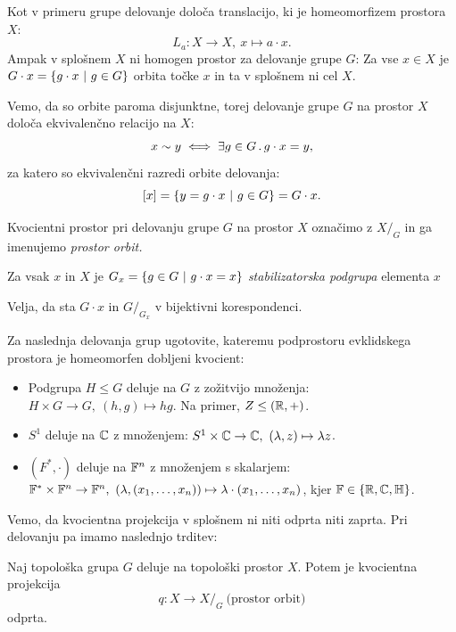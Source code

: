 \begin{opomba}
    Kot v primeru grupe delovanje določa translacijo, ki je homeomorfizem prostora \(X\): 
    \[L_a: X \to X, \ x \mapsto a \cdot x.\]
    Ampak v splošnem \(X\) ni homogen prostor za delovanje grupe \(G\): Za vse \(x \in X\) je \(G \cdot x = \left\{g \cdot x \ | \ g \in G\right\}\) orbita točke \(x\) in ta v splošnem ni cel \(X\). 
\end{opomba}

Vemo, da so orbite paroma disjunktne, torej delovanje grupe \(G\) na prostor \(X\) določa ekvivalenčno relacijo na \(X\):
\[x \sim y \iff \exists g \in G \,.\, g \cdot x = y,\]
za katero so ekvivalenčni razredi orbite delovanja:
\[[x] = \left\{y = g \cdot x \ | \ g \in G\right\} = G \cdot x.\]
%
\begin{definicija}
    Kvocientni prostor pri delovanju grupe \(G\) na prostor \(X\) označimo z \(X/_G\) in ga imenujemo \emph{prostor orbit.}
\end{definicija}

\begin{definicija}
    Za vsak \(x\) in \(X\) je \(G_x = \left\{g \in G \ | \ g \cdot x = x\right\}\) \emph{stabilizatorska podgrupa} elementa \(x\)
\end{definicija}

\begin{opomba}
    Velja, da sta \(G \cdot x\) in \(G/_{G_x}\) v bijektivni korespondenci.
\end{opomba}

\begin{primer}
    Za naslednja delovanja grup ugotovite, kateremu podprostoru evklidskega prostora je homeomorfen dobljeni kvocient:
    \begin{itemize}
        \item Podgrupa \(H \leq G\) deluje na \(G\) z zožitvijo množenja: \(H \times G \to G, \ (h, g) \mapsto hg\). Na primer, \(Z \leq (\mathbb{R}, +)\).
        \item \(S^1\) deluje na \(\mathbb{C}\) z množenjem: \(S^1 \times \mathbb{C} \to \mathbb{C}, \ (\lambda, z) \mapsto \lambda z\).
        \item \((F^*, \cdot)\) deluje na \(\mathbb{F}^n\) z množenjem s skalarjem: \(\F^* \times \F^n \to \F^n, \ (\lambda, (x_1, \ldots, x_n)) \mapsto \lambda \cdot (x_1, \ldots, x_n)\), kjer \(\mathbb{F} \in \left\{\mathbb{R}, \mathbb{C}, \mathbb{H}\right\}\). 
    \end{itemize}
\end{primer}

Vemo, da kvocientna projekcija v splošnem ni niti odprta niti zaprta. Pri delovanju pa imamo naslednjo trditev:
\begin{trditev}
    Naj topološka grupa \(G\) deluje na topološki prostor \(X\). Potem je kvocientna projekcija 
    \[q: X \to X/_G \ \text{(prostor orbit)}\]
    odprta.
\end{trditev}

